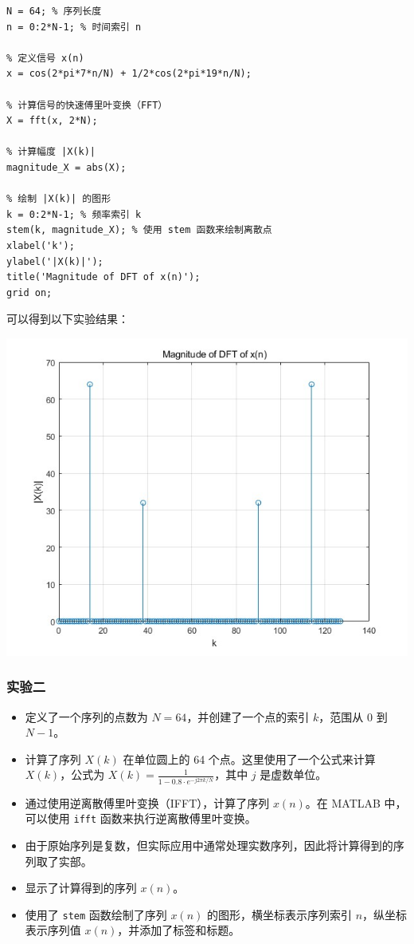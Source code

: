 \documentclass[a4paper,12pt]{article}
\begin{document}
\begin{lstlisting}
N = 64; % 序列长度
n = 0:2*N-1; % 时间索引 n

% 定义信号 x(n)
x = cos(2*pi*7*n/N) + 1/2*cos(2*pi*19*n/N);

% 计算信号的快速傅里叶变换（FFT）
X = fft(x, 2*N);

% 计算幅度 |X(k)|
magnitude_X = abs(X);

% 绘制 |X(k)| 的图形
k = 0:2*N-1; % 频率索引 k
stem(k, magnitude_X); % 使用 stem 函数来绘制离散点
xlabel('k');
ylabel('|X(k)|');
title('Magnitude of DFT of x(n)');
grid on;

\end{lstlisting}

可以得到以下实验结果：
    
\centering 
\includegraphics[width=0.8\linewidth]{images/2_Verify/verify1.jpg}
\justifying

\subsubsection{实验二}
\begin{itemize}
    \item 定义了一个序列的点数为 \( N = 64 \)，并创建了一个点的索引 \( k \)，范围从 0 到 \( N-1 \)。
    \item 计算了序列 \( X(k) \) 在单位圆上的 64 个点。这里使用了一个公式来计算 \( X(k) \)，公式为 \( X(k) = \frac{1}{1 - 0.8 \cdot e^{-j2\pi k/N}} \)，其中 \( j \) 是虚数单位。
    \item 通过使用逆离散傅里叶变换（IFFT），计算了序列 \( x(n) \)。在 MATLAB 中，可以使用 \texttt{ifft} 函数来执行逆离散傅里叶变换。
    \item 由于原始序列是复数，但实际应用中通常处理实数序列，因此将计算得到的序列取了实部。
    \item 显示了计算得到的序列 \( x(n) \)。
    \item 使用了 \texttt{stem} 函数绘制了序列 \( x(n) \) 的图形，横坐标表示序列索引 \( n \)，纵坐标表示序列值 \( x(n) \)，并添加了标签和标题。
\end{itemize}
\end{document}
